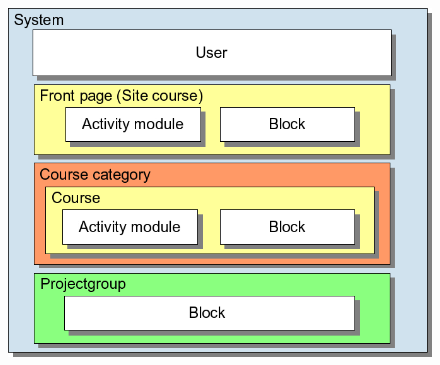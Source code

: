 \begin{frame}{\implementaras}{\topicthreee}
\begin{figure}
\includegraphics[width=\columnwidth]{input/rasmus/Moodle-contexts-mymoodle.png}
\end{figure}
\end{frame}
